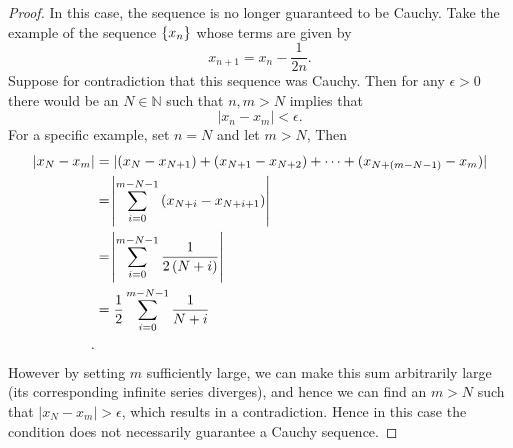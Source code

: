 \documentclass{article}
\newcommand{\N}{\mathbb{N}}
\begin{document}
\begin{proof}

In this case, the sequence is no longer guaranteed to be Cauchy.
Take the example of the sequence $\cbr{x_n}$ whose terms are given by
%
\begin{equation*}
    x_{n + 1} = x_n - \frac{1}{2 n}
    .
\end{equation*}
%
Suppose for contradiction that this sequence  was Cauchy. Then for any
$\epsilon > 0$ there would be an $N \in \N$ such that $n, m > N$ implies
that
%
\begin{equation*}
    |x_n - x_m| < \epsilon
    .
\end{equation*}
%
For a specific example, set $n = N$ and let $m > N$,
Then
%
\begin{align*}
    |x_N - x_m|
        &= |(x_N - x_{N + 1}) + (x_{N + 1} - x_{N + 2}) + \cdots + (x_{N + (m - N - 1)} - x_m)| \\
        &= \envert{ \sum_{i = 0}^{m - N - 1} \del{x_{N + i} - x_{N + i + 1}} } \\
        &= \envert{ \sum_{i = 0}^{m - N - 1} \frac{1}{2 \del{N + i}} } \\
        &= \frac{1}{2} \sum_{i = 0}^{m - N - 1} \frac{1}{N + i} \\
    .
\end{align*}
%
However by setting $m$ sufficiently large, we can make this sum
arbitrarily large (its corresponding infinite series diverges), and
hence we can find an $m > N$ such that $|x_N - x_m| > \epsilon$, which
results in a contradiction. Hence in this case the condition does not
necessarily guarantee a Cauchy sequence.

\end{proof}
\end{document}
